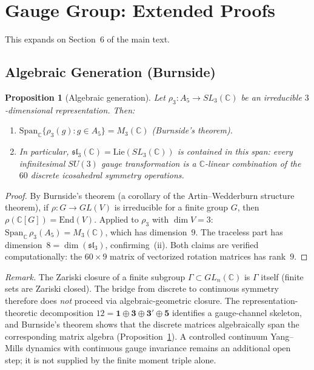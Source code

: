 \documentclass[12pt,a4paper]{article}
\newtheorem{proposition}{Proposition}
\theoremstyle{definition}
\begin{document}
\section{Gauge Group: Extended Proofs}
\label{sec:S-gauge}

This expands on Section~6 of the main text.

\subsection{Algebraic Generation (Burnside)}

\begin{proposition}[Algebraic generation]\label{prop:S-burnside}
Let $\rho_3: A_5 \to SL_3(\mathbb{C})$ be an irreducible $3$-dimensional representation.  Then:
\begin{enumerate}
\item[(i)] $\mathrm{Span}_{\mathbb{C}}\{\rho_3(g) : g \in A_5\} = M_3(\mathbb{C})$ \textup{(Burnside's theorem)}.
\item[(ii)] In particular, $\mathfrak{sl}_3(\mathbb{C}) = \mathrm{Lie}(SL_3(\mathbb{C}))$ is contained in this span: every infinitesimal $SU(3)$ gauge transformation is a $\mathbb{C}$-linear combination of the $60$ discrete icosahedral symmetry operations.
\end{enumerate}
\end{proposition}

\begin{proof}
By Burnside's theorem (a corollary of the Artin--Wedderburn structure theorem), if $\rho: G \to GL(V)$ is irreducible for a finite group $G$, then $\rho(\mathbb{C}[G]) = \mathrm{End}(V)$.  Applied to $\rho_3$ with $\dim V = 3$: $\mathrm{Span}_{\mathbb{C}}\,\rho_3(A_5) = M_3(\mathbb{C})$, which has dimension~$9$.  The traceless part has dimension~$8 = \dim(\mathfrak{sl}_3)$, confirming~(ii).  Both claims are verified computationally: the $60 \times 9$ matrix of vectorized rotation matrices has rank~$9$.
\end{proof}

\noindent\textit{Remark.}  The Zariski closure of a finite subgroup $\Gamma \subset GL_n(\mathbb{C})$ is $\Gamma$ itself (finite sets are Zariski closed).  The bridge from discrete to continuous symmetry therefore does \emph{not} proceed via algebraic-geometric closure.  The representation-theoretic decomposition $12 = \mathbf{1} \oplus \mathbf{3} \oplus \mathbf{3'} \oplus \mathbf{5}$ identifies a gauge-channel skeleton, and Burnside's theorem shows that the discrete matrices algebraically span the corresponding matrix algebra (Proposition~\ref{prop:S-burnside}).  A controlled continuum Yang--Mills dynamics with continuous gauge invariance remains an additional open step; it is not supplied by the finite moment triple alone.
\end{document}
